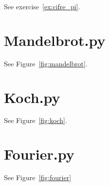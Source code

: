 See exercise~\ref{ex:cifre_pi}.
\label{code:compute_pi}


\section{Mandelbrot.py}

See Figure~\ref{fig:mandelbrot}.
\label{code:Mandelbrot}


\section{Koch.py}

See Figure~\ref{fig:koch}.
\label{code:Koch}


\section{Fourier.py}

See Figure~\ref{fig:fourier}
\label{code:Fourier}
